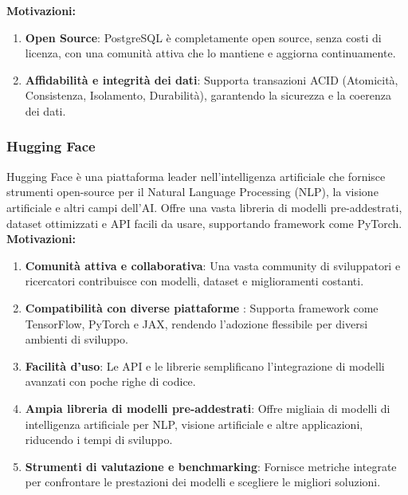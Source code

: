 \textbf{Motivazioni:}
\begin{enumerate}
    \item \textbf{Open Source}: PostgreSQL è completamente open source, senza costi di licenza, con una comunità attiva che lo mantiene e aggiorna continuamente.
    \item \textbf{Affidabilità e integrità dei dati}: Supporta transazioni ACID (Atomicità, Consistenza, Isolamento, Durabilità), garantendo la sicurezza e la coerenza dei dati.
\end{enumerate}

\subsubsection{Hugging Face}
\label{subsubsec:huggingface}
Hugging Face è una piattaforma leader nell'intelligenza artificiale che fornisce strumenti open-source per il Natural Language Processing (NLP), la visione artificiale e altri campi dell'AI. 
Offre una vasta libreria di modelli pre-addestrati, dataset ottimizzati e API facili da usare, supportando framework come PyTorch.\\

\textbf{Motivazioni:}
\begin{enumerate}
    \item \textbf{Comunità attiva e collaborativa}: Una vasta community di sviluppatori e ricercatori contribuisce con modelli, dataset e miglioramenti costanti.
    \item \textbf{Compatibilità con diverse piattaforme }: Supporta framework come TensorFlow, PyTorch e JAX, rendendo l'adozione flessibile per diversi ambienti di sviluppo.
    \item \textbf{Facilità d'uso}: Le API e le librerie semplificano l'integrazione di modelli avanzati con poche righe di codice.
    \item \textbf{Ampia libreria di modelli pre-addestrati}: Offre migliaia di modelli di intelligenza artificiale per NLP, visione artificiale e altre applicazioni, riducendo i tempi di sviluppo.
    \item \textbf{Strumenti di valutazione e benchmarking}: Fornisce metriche integrate per confrontare le prestazioni dei modelli e scegliere le migliori soluzioni.
\end{enumerate}